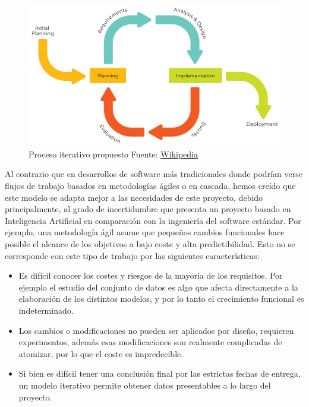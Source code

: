 \documentclass[11pt,a4paper,spanish]{book}
\begin{document}
	\begin{figure}[H]
		\centering
		\includegraphics[scale=0.15]{Iterative_Process_Diagram.png}
		\caption{Proceso iterativo propuesto Fuente: \href{https://en.wikipedia.org/wiki/Iterative_and_incremental_development}{Wikipedia}}
		\label{fig:iterative_process}
	\end{figure}


		Al contrario que en desarrollos de software más tradicionales donde podrían verse flujos de trabajo basados en metodologías ágiles o en cascada, hemos creído que este modelo se adapta mejor a las necesidades de este proyecto, debido principalmente, al grado de incertidumbre que presenta un proyecto basado en Inteligencia Artificial en comparación con la ingeniería del software estándar. Por ejemplo, una metodología ágil asume que pequeños cambios funcionales hace posible el alcance de los objetivos a bajo coste y alta predictibilidad. Esto no se corresponde con este tipo de trabajo por las siguientes características:
		
		\begin{itemize}
			\item Es difícil conocer los costes y riesgos de la mayoría de los requisitos. Por ejemplo el estudio del conjunto de datos es algo que afecta directamente a la elaboración de los distintos modelos, y por lo tanto el crecimiento funcional es indeterminado.  
			
			\item Los cambios o modificaciones no pueden ser aplicados por diseño, requieren experimentos, además esas modificaciones son realmente complicadas de atomizar, por lo que el coste es impredecible. 
			
			\item Si bien es difícil tener una conclusión final por las estrictas fechas de entrega, un modelo iterativo permite obtener datos presentables a lo largo del proyecto.
		\end{itemize}
	
	
		
	
\end{document}
